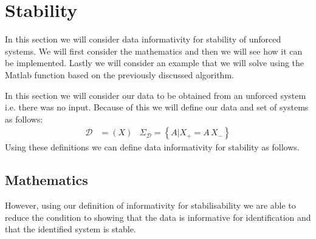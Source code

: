 \section{Stability}
In this section we will consider data informativity for stability of unforced systems. We will first consider the mathematics and then we will see how it can be implemented. Lastly we will consider an example that we will solve using the Matlab function based on the previously discussed algorithm.

In this section we will consider our data to be obtained from an unforced system i.e. there was no input. Because of this we will define our data and set of systems as follows:
\begin{align*}
\mathcal{D} &= (X) & \Sigma_\mathcal{D} = \left\{ A | X_+ = A \, X_- \right\}
\end{align*}
Using these definitions we can define data informativity for stability as follows.



\subsection{Mathematics}
However, using our definition of informativity for stabilisability we are able to reduce the condition to showing that the data is informative for identification and that the identified system is stable.



